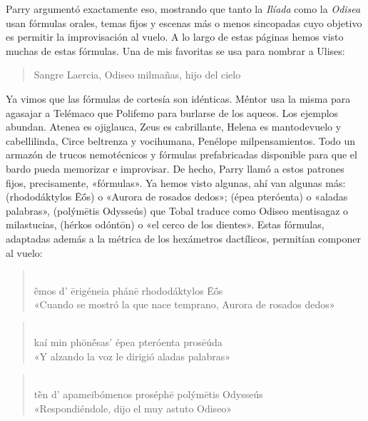 Parry argumentó exactamente eso, mostrando que tanto la \emph{Ilíada} como la \emph{Odisea} usan fórmulas orales, temas fijos y escenas más o menos sincopadas cuyo objetivo es permitir la improvisación al vuelo. A lo largo de estas páginas hemos visto muchas de estas fórmulas. Una de mis favoritas se usa para nombrar a Ulises:

\begin{verse}
Sangre Laercia, Odiseo milmañas, hijo del cielo
\end{verse}

Ya vimos que las fórmulas de cortesía son idénticas. Méntor usa la misma para agasajar a Telémaco que Polifemo para burlarse de los aqueos. Los ejemplos abundan. Atenea es ojiglauca, Zeus es cabrillante, Helena es mantodevuelo y cabellilinda, Circe beltrenza y vocihumana, Penélope milpensamientos. Todo un armazón de trucos nemotécnicos y fórmulas prefabricadas disponible para que el bardo pueda memorizar e improvisar. De hecho, Parry llamó a estos patrones fijos, precisamente, «fórmulas». Ya hemos visto algunas, ahí van algunas más:  (rhododáktylos Ēṓs) o «Aurora de rosados dedos»;  (épea pteróenta) o «aladas palabras»,  (polýmētis Odysseús) que Tobal traduce como Odiseo mentisagaz o milastucias,  (hérkos odóntōn) o «el cerco de los dientes». Estas fórmulas, adaptadas además a la métrica de los hexámetros dactílicos, permitían componer al vuelo:

\begin{verse}
\\
êmos d' ērigéneia phánē rhododáktylos Ēṓs\\
«Cuando se mostró la que nace temprano, Aurora de rosados dedos»
\end{verse}

\begin{verse}
\\
kaí min phōnḗsas' épea pteróenta prosēúda\\
«Y alzando la voz le dirigió aladas palabras»
\end{verse}

\begin{verse}
\\
tḕn d' apameibómenos proséphē polýmētis Odysseús\\
«Respondiéndole, dijo el muy astuto Odiseo»
\end{verse}

